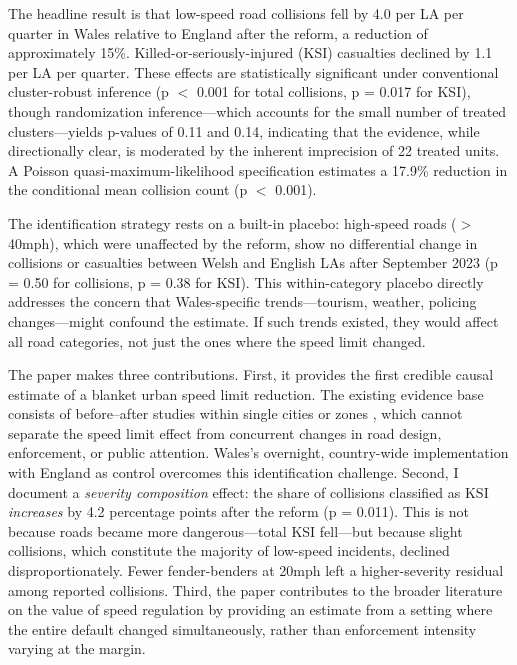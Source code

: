 \documentclass[12pt]{article}
\begin{document}
The headline result is that low-speed road collisions fell by 4.0 per LA per quarter in Wales relative to England after the reform, a reduction of approximately 15\%. Killed-or-seriously-injured (KSI) casualties declined by 1.1 per LA per quarter. These effects are statistically significant under conventional cluster-robust inference (p $<$ 0.001 for total collisions, p = 0.017 for KSI), though randomization inference---which accounts for the small number of treated clusters---yields p-values of 0.11 and 0.14, indicating that the evidence, while directionally clear, is moderated by the inherent imprecision of 22 treated units. A Poisson quasi-maximum-likelihood specification estimates a 17.9\% reduction in the conditional mean collision count (p $<$ 0.001).

The identification strategy rests on a built-in placebo: high-speed roads ($>$40mph), which were unaffected by the reform, show no differential change in collisions or casualties between Welsh and English LAs after September 2023 (p = 0.50 for collisions, p = 0.38 for KSI). This within-category placebo directly addresses the concern that Wales-specific trends---tourism, weather, policing changes---might confound the estimate. If such trends existed, they would affect all road categories, not just the ones where the speed limit changed.

The paper makes three contributions. First, it provides the first credible causal estimate of a blanket urban speed limit reduction. The existing evidence base consists of before--after studies within single cities or zones \citep{grundy2009effect, steinbach2011twenty}, which cannot separate the speed limit effect from concurrent changes in road design, enforcement, or public attention. Wales's overnight, country-wide implementation with England as control overcomes this identification challenge. Second, I document a \emph{severity composition} effect: the share of collisions classified as KSI \emph{increases} by 4.2 percentage points after the reform (p = 0.011). This is not because roads became more dangerous---total KSI fell---but because slight collisions, which constitute the majority of low-speed incidents, declined disproportionately. Fewer fender-benders at 20mph left a higher-severity residual among reported collisions. Third, the paper contributes to the broader literature on the value of speed regulation \citep{ashenfelter2004using, peltzman1975effects} by providing an estimate from a setting where the entire default changed simultaneously, rather than enforcement intensity varying at the margin.
\end{document}
